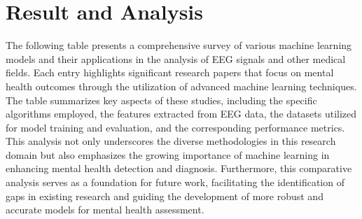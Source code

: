 \documentclass[conference]{IEEEtran}
\begin{document}
\section{Result and Analysis}
The following table presents a comprehensive survey of various machine learning models and their applications in the analysis of EEG signals and other medical fields. Each entry highlights significant research papers that focus on mental health outcomes through the utilization of advanced machine learning techniques. The table summarizes key aspects of these studies, including the specific algorithms employed, the features extracted from EEG data, the datasets utilized for model training and evaluation, and the corresponding performance metrics. This analysis not only underscores the diverse methodologies in this research domain but also emphasizes the growing importance of machine learning in enhancing mental health detection and diagnosis.
 Furthermore, this comparative analysis serves as a foundation for future work, facilitating the identification of gaps in existing research and guiding the development of more robust and accurate models for mental health assessment.
\end{document}
